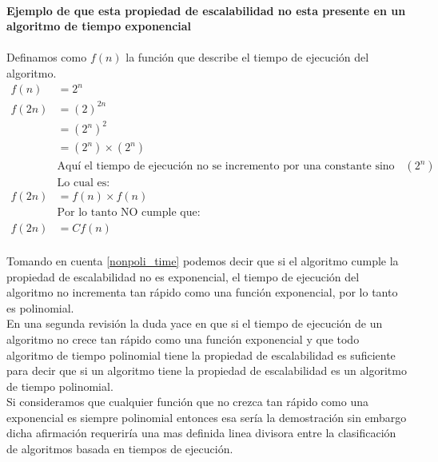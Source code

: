 \documentclass[12pt]{article}
\begin{document}
\paragraph{Ejemplo de que esta propiedad de escalabilidad no esta presente en un algoritmo de tiempo exponencial}
\paragraph{}
Definamos como $f(n)$ la función que describe el tiempo de ejecución del algoritmo.
\begin{equation}\label{nonpoli_time}
\begin{split}
f(n) &= 2^{n}\\
f(2n) &= (2)^{2n} \\
&=(2^{n})^{2}\\
&=(2^{n}) \times (2^{n}) \\
&\text{Aquí el tiempo de ejecución no se incremento por una constante sino por $(2^{n})$}\\
&\text{Lo cual es:}\\
f(2n) &= f(n)\times f(n)\\
&\text{Por lo tanto NO cumple que:}\\
f(2n) &= Cf(n)
\end{split}
\end{equation}
\pagebreak
\paragraph{}
Tomando en cuenta \ref{nonpoli_time} podemos decir que si el algoritmo cumple la propiedad de escalabilidad no es exponencial, el tiempo de ejecución del algoritmo no incrementa tan rápido como una función exponencial, por lo tanto es polinomial.\\
En una segunda revisión la duda yace en que si el tiempo de ejecución de un algoritmo no crece tan rápido como una función exponencial y que todo algoritmo de tiempo polinomial tiene la propiedad de escalabilidad es suficiente para decir que si un algoritmo tiene la propiedad de escalabilidad es un algoritmo de tiempo polinomial. \\
Si consideramos que cualquier función que no crezca tan rápido como una exponencial es siempre polinomial entonces esa sería la demostración sin embargo dicha afirmación requeriría una mas definida linea divisora entre la clasificación de algoritmos basada en tiempos de ejecución.
\end{document}
